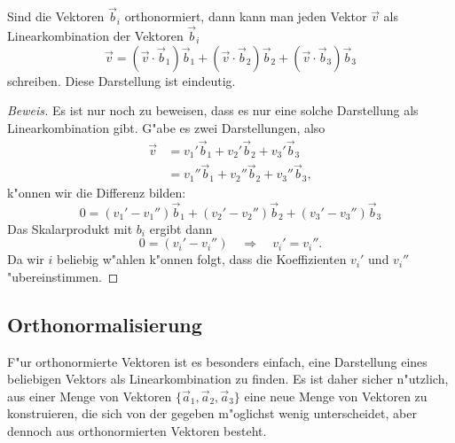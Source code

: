 \begin{satz}
Sind die Vektoren $\vec b_i$ orthonormiert, dann kann man jeden
Vektor $\vec v$ als Linearkombination der Vektoren $\vec b_i$
\[
\vec v=
(\vec v\cdot\vec b_1)\vec b_1
+
(\vec v\cdot\vec b_2)\vec b_2
+
(\vec v\cdot\vec b_3)\vec b_3
\]
schreiben.
Diese Darstellung ist eindeutig.
\end{satz}

\begin{proof}[Beweis]
Es ist nur noch zu beweisen, dass es nur eine solche Darstellung als
Linearkombination gibt.
G"abe es zwei Darstellungen, also
\begin{align*}
\vec v
&=
v_1'\vec b_1+
v_2'\vec b_2+
v_3'\vec b_3\\
&=
v_1''\vec b_1+
v_2''\vec b_2+
v_3''\vec b_3,
\end{align*}
k"onnen wir die Differenz bilden:
\[
0=
(v_1'-v_1'')\vec b_1
+
(v_2'-v_2'')\vec b_2
+
(v_3'-v_3'')\vec b_3
\]
Das Skalarprodukt mit $b_i$ ergibt dann
\[
0=(v_i'-v_i'')\quad\Rightarrow\quad v_i'=v_i''.
\]
Da wir $i$ beliebig w"ahlen k"onnen folgt, dass die
Koeffizienten $v_i'$ und $v_i''$ "ubereinstimmen.
\end{proof}



\subsection{Orthonormalisierung}
F"ur orthonormierte Vektoren ist es besonders einfach, eine Darstellung
eines beliebigen Vektors als Linearkombination zu finden.
Es ist daher sicher n"utzlich, aus einer Menge von Vektoren
$\{\vec a_1,\vec a_2,\vec a_3\}$
eine neue Menge von Vektoren zu konstruieren, die sich von der gegeben
m"oglichst wenig
unterscheidet, aber dennoch aus orthonormierten Vektoren besteht.

